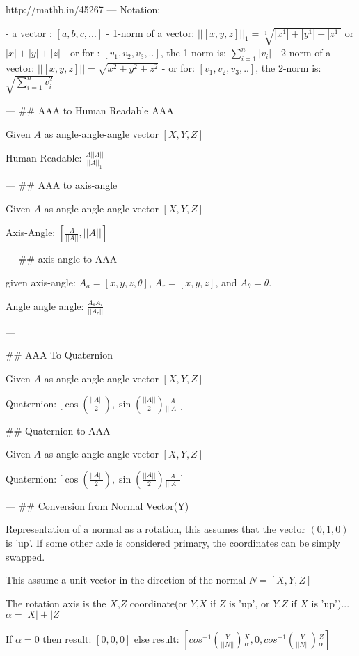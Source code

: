 http://mathb.in/45267
---
Notation:
 
 - a vector : $[a,b,c,...]$
 - 1-norm of a vector: $ ||[x,y,z]||_1 = \sqrt[1] {|x^1|+|y^1|+|z^1|} $ or $ |x|+|y|+|z| $ 
     - or for : $ [v_1,v_2,v_3,..] $, the 1-norm is: $ \sum_{i=1}^n |v_i|  $
 - 2-norm of a vector: $ ||[x,y,z]|| = \sqrt { x^2+y^2+z^2 } $
   - or for: $ [v_1,v_2,v_3,..] $, the 2-norm is: $ \sqrt { \sum_{i=1}^n v_i^2 } $

---
## AAA to Human Readable AAA

Given $A$ as angle-angle-angle vector $[{X},{Y} ,{Z}] $ 

Human Readable: $ \frac { A ||A|| } {||A||_1} $

---
## AAA to axis-angle

Given $A$ as angle-angle-angle vector $[{X},{Y} ,{Z}] $ 

Axis-Angle: $ [ \frac {A} {||A||}, ||{A}|| ] $

---
## axis-angle to AAA

given axis-angle:
$ A_a =[ {x},{y},{z},{{\theta}}]  $, $A_r=[x,y,z]$, and $A_\theta = \theta$.

Angle angle angle: $   \frac  {{A_\theta}A_r} {||A_r||} $

---


## AAA To Quaternion

Given $A$ as angle-angle-angle vector $[{X},{Y} ,{Z}]$

Quaternion: [$\cos(\frac {||A||} {2} ),  \sin ( \frac {||A||} {2} ) \frac A {|||A||} $]


## Quaternion to AAA

Given $A$ as angle-angle-angle vector $[{X},{Y} ,{Z}]$

Quaternion: [$\cos(\frac {||A||} {2} ),  \sin ( \frac {||A||} {2} ) \frac A {|||A||} $]


---
## Conversion from Normal Vector(Y)

Representation of a normal as a rotation, this assumes that the vector $(0,1,0)$ is 'up'.  If some other axle is considered primary, the coordinates can be simply swapped.

This assume a unit vector in the direction of the normal
$N = [ X, Y, Z ]$


The rotation axis is the $X$,$Z$ coordinate(or $Y$,$X$ if $Z$ is 'up', or $Y$,$Z$ if $X$ is 'up')...
$   \alpha = |X| + |Z|$

If $\alpha = 0$ then result: $[0,0,0]$
else result: $ [      cos^{-1}( \frac {Y} {||N||} ) \frac X \alpha, 	0, cos^{-1}( \frac Y {||N||}) \frac Z \alpha ] $

